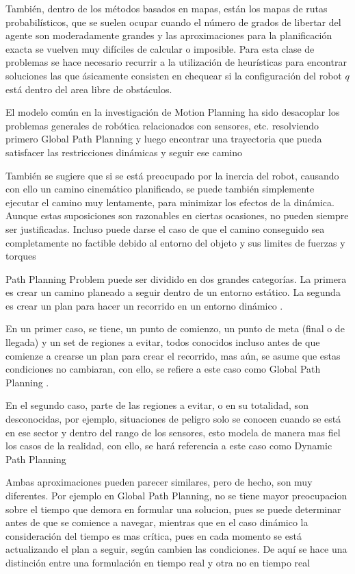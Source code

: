 Tambi\'en, dentro de los m\'etodos basados en mapas, est\'an los mapas de rutas probabil\'isticos,  que se suelen ocupar cuando el n\'umero de grados de libertar del agente son moderadamente grandes y las aproximaciones para la planificaci\'on exacta se vuelven muy dif\'iciles de calcular o imposible.  Para esta clase de problemas se hace necesario recurrir a la utilizaci\'on de heur\'isticas para encontrar soluciones las que \'asicamente consisten en chequear si la configuraci\'on del robot $q$ est\'a dentro del area libre de obst\'aculos. 


El modelo com\'un en la investigaci\'on de Motion Planning ha sido desacoplar los problemas generales de rob\'otica relacionados con sensores, etc. resolviendo primero Global Path Planning y luego encontrar una trayectoria que pueda satisfacer las restricciones din\'amicas y seguir ese camino \cite{LaValle99}


Tambi\'en se sugiere que si se est\'a preocupado por la inercia del robot, causando con ello un camino cinem\'atico planificado, se puede tambi\'en simplemente ejecutar el camino muy lentamente, para minimizar los efectos de la din\'amica. Aunque estas suposiciones son razonables en ciertas ocasiones, no pueden siempre ser justificadas. Incluso puede darse el caso de que el camino conseguido sea completamente no factible debido al entorno del objeto y sus limites de fuerzas y torques \cite{LaValle99}

Path Planning Problem puede ser dividido en dos grandes categor\'ias. La primera es crear un camino planeado a seguir dentro de un entorno est\'atico. La segunda es crear un plan para hacer un recorrido en un entorno din\'amico \cite{Goldman94}.

En un primer caso, se tiene, un punto de comienzo, un punto de meta (final o de llegada) y un set de regiones a evitar, todos conocidos incluso antes de que comienze a crearse un plan para crear el recorrido, mas a\'un, se asume que estas condiciones no cambiaran, con ello, se refiere a este caso como Global Path Planning \cite{Goldman94}.

En el segundo caso, parte de las regiones a evitar, o en su totalidad, son desconocidas, por ejemplo, situaciones de peligro solo se conocen cuando se est\'a en ese sector y dentro del rango de los sensores, esto modela de manera mas fiel los casos de la realidad, con ello, se har\'a referencia a este caso como Dynamic Path Planning

Ambas aproximaciones pueden parecer similares, pero de hecho, son muy diferentes. Por ejemplo en Global Path Planning, no se tiene mayor preocupacion sobre el tiempo que demora en formular una solucion, pues se puede determinar antes de que se comience a navegar, mientras que en el caso din\'amico la consideraci\'on del tiempo es mas cr\'itica, pues en cada momento se est\'a actualizando el plan a seguir, seg\'un cambien las condiciones. De aqu\'i se hace una distinci\'on entre una formulaci\'on en tiempo real y otra no en tiempo real \cite{Goldman94}

